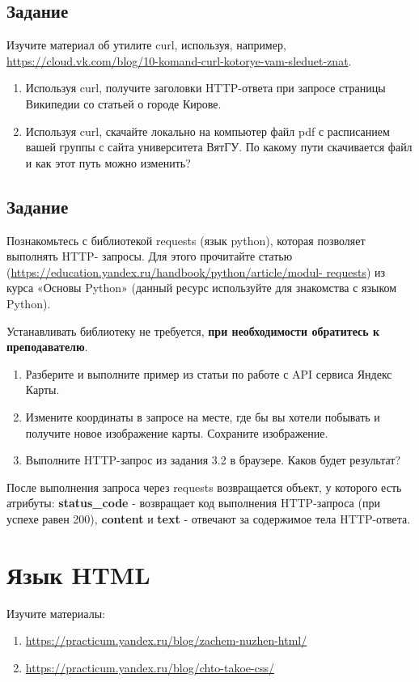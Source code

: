 \documentclass[a4paper,12pt]{extarticle}
\begin{document}
\subsection{Задание}

Изучите материал об утилите curl, используя, например, \url{https://cloud.vk.com/blog/10-komand-curl-kotorye-vam-sleduet-znat}.

\begin{enumerate}[label=\alph*)]
  \item Используя curl, получите заголовки HTTP-ответа при запросе страницы Википедии со статьей о городе Кирове.
  \item Используя curl, скачайте локально на компьютер файл pdf с расписанием вашей группы с сайта университета ВятГУ. По какому пути скачивается файл и как этот путь можно изменить?
\end{enumerate}

\subsection{Задание}
Познакомьтесь с библиотекой requests (язык python), которая позволяет выполнять HTTP-
запросы. Для этого прочитайте статью (\url{https://education.yandex.ru/handbook/python/article/modul-
requests}) из курса «Основы Python» (данный ресурс используйте для знакомства с языком Python).

Устанавливать библиотеку не требуется, \textbf{при необходимости обратитесь к преподавателю}.
\begin{enumerate}[label=\alph*)]
  \item Разберите и выполните пример из статьи по работе с API сервиса Яндекс Карты.
  \item Измените координаты в запросе на месте, где бы вы хотели побывать и получите новое изображение карты. Сохраните изображение.
  \item Выполните HTTP-запрос из задания 3.2 в браузере. Каков будет результат?
\end{enumerate}

\begin{leftbar}
  После выполнения запроса через requests возвращается объект, у которого есть атрибуты: \textbf{status\_code} - возвращает код выполнения HTTP-запроса (при успехе равен 200), \textbf{content} и \textbf{text} - отвечают за содержимое тела HTTP-ответа.
\end{leftbar}

\section{Язык HTML}
Изучите материалы:
\begin{enumerate}
  \item \url{https://practicum.yandex.ru/blog/zachem-nuzhen-html/}
  \item \url{https://practicum.yandex.ru/blog/chto-takoe-css/}
\end{enumerate}
\end{document}
